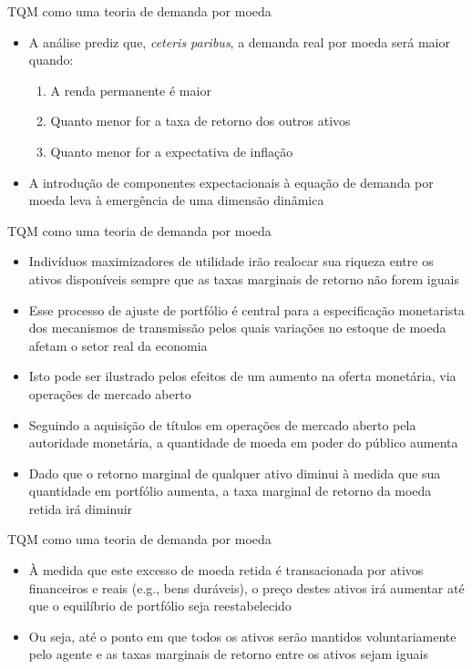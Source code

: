 \documentclass[10pt]{beamer}
\begin{document}
\begin{frame}{TQM como uma teoria de demanda por moeda}
    \begin{itemize}
        \item A análise prediz que, \emph{ceteris paribus}, a demanda real por moeda será maior quando:
        \bigskip
        \begin{enumerate}
            \item A renda permanente é maior
            \medskip
            \item Quanto menor for a taxa de retorno dos outros ativos
            \medskip
            \item Quanto menor for a expectativa de inflação
        \end{enumerate}
        \bigskip
        \item A introdução de componentes expectacionais à equação de demanda por moeda leva à emergência de uma dimensão dinâmica
    \end{itemize}
\end{frame}

\begin{frame}{TQM como uma teoria de demanda por moeda}
    \begin{itemize}
        \item Indivíduos maximizadores de utilidade irão realocar sua riqueza entre os ativos disponíveis sempre que as taxas marginais de retorno não forem iguais
        \bigskip
        \item Esse processo de ajuste de portfólio é central para a especificação monetarista dos mecanismos de transmissão pelos quais variações no estoque de moeda afetam o setor real da economia
        \bigskip
        \item Isto pode ser ilustrado pelos efeitos de um aumento na oferta monetária, via operações de mercado aberto
        \bigskip
        \item Seguindo a aquisição de títulos em operações de mercado aberto pela autoridade monetária, a quantidade de moeda em poder do público aumenta
        \bigskip
        \item Dado que o retorno marginal de qualquer ativo diminui à medida que sua quantidade em portfólio aumenta, a taxa marginal de retorno da moeda retida irá diminuir
    \end{itemize}
\end{frame}

\begin{frame}{TQM como uma teoria de demanda por moeda}
    \begin{itemize}
        \item À medida que este excesso de moeda retida é transacionada por ativos financeiros e reais (e.g., bens duráveis), o preço destes ativos irá aumentar até que o equilíbrio de portfólio seja reestabelecido
        \bigskip
        \item Ou seja, até o ponto em que todos os ativos serão mantidos voluntariamente pelo agente e as taxas marginais de retorno entre os ativos sejam iguais
    \end{itemize}
\end{frame}
\end{document}
